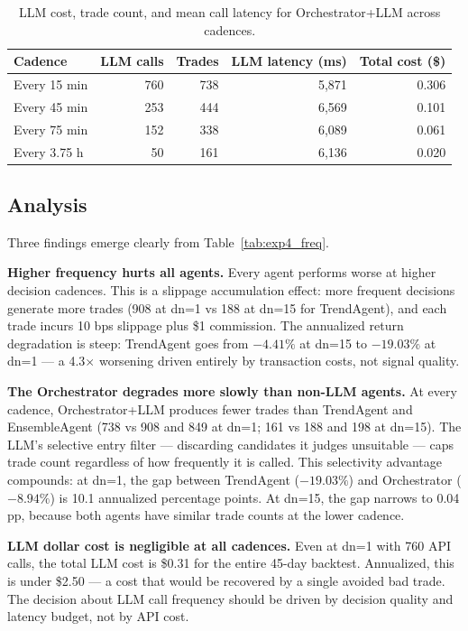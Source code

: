 \documentclass[10pt,conference]{IEEEtran}
\begin{document}
\begin{table}[h]
    \centering
    \caption{LLM cost, trade count, and mean call latency for Orchestrator+LLM across cadences.}
    \begin{tabular}{lrrrr}
        \toprule
        \textbf{Cadence} & \textbf{LLM calls} & \textbf{Trades} & \textbf{LLM latency (ms)} & \textbf{Total cost (\$)} \\
        \midrule
        Every 15 min  & 760 & 738 & 5,871 & 0.306 \\
        Every 45 min  & 253 & 444 & 6,569 & 0.101 \\
        Every 75 min  & 152 & 338 & 6,089 & 0.061 \\
        Every 3.75 h  & 50  & 161 & 6,136 & 0.020 \\
        \bottomrule
    \end{tabular}
    \label{tab:exp4_cost}
\end{table}

\subsection{Analysis}

Three findings emerge clearly from Table~\ref{tab:exp4_freq}.

\textbf{Higher frequency hurts all agents.} Every agent performs worse at higher decision cadences. This is a slippage accumulation effect: more frequent decisions generate more trades (908 at dn=1 vs 188 at dn=15 for TrendAgent), and each trade incurs 10 bps slippage plus \$1 commission. The annualized return degradation is steep: TrendAgent goes from $-4.41\%$ at dn=15 to $-19.03\%$ at dn=1 --- a 4.3$\times$ worsening driven entirely by transaction costs, not signal quality.

\textbf{The Orchestrator degrades more slowly than non-LLM agents.} At every cadence, Orchestrator+LLM produces fewer trades than TrendAgent and EnsembleAgent (738 vs 908 and 849 at dn=1; 161 vs 188 and 198 at dn=15). The LLM's selective entry filter --- discarding candidates it judges unsuitable --- caps trade count regardless of how frequently it is called. This selectivity advantage compounds: at dn=1, the gap between TrendAgent ($-19.03\%$) and Orchestrator ($-8.94\%$) is 10.1 annualized percentage points. At dn=15, the gap narrows to 0.04 pp, because both agents have similar trade counts at the lower cadence.

\textbf{LLM dollar cost is negligible at all cadences.} Even at dn=1 with 760 API calls, the total LLM cost is \$0.31 for the entire 45-day backtest. Annualized, this is under \$2.50 --- a cost that would be recovered by a single avoided bad trade. The decision about LLM call frequency should be driven by decision quality and latency budget, not by API cost.
\end{document}
